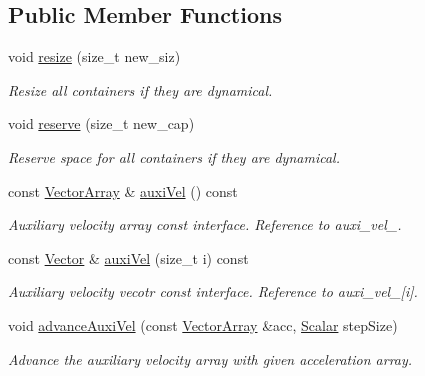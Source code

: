 \subsection*{Public Member Functions}
\begin{DoxyCompactItemize}
\item 
void \mbox{\hyperlink{class_space_h_1_1_vel_dep_particles_a38c984c371c95273fded00e1810473f9}{resize}} (size\+\_\+t new\+\_\+siz)
\begin{DoxyCompactList}\small\item\em Resize all containers if they are dynamical. \end{DoxyCompactList}\item 
void \mbox{\hyperlink{class_space_h_1_1_vel_dep_particles_a47b3d3219ae00febce8c2a3d779f5aee}{reserve}} (size\+\_\+t new\+\_\+cap)
\begin{DoxyCompactList}\small\item\em Reserve space for all containers if they are dynamical. \end{DoxyCompactList}\item 
const \mbox{\hyperlink{class_space_h_1_1_vel_indep_particles_aa9983058940249df8b00fa800e8cbad2}{Vector\+Array}} \& \mbox{\hyperlink{class_space_h_1_1_vel_dep_particles_a345c6bc4002525f79ae0cfb5232f35df}{auxi\+Vel}} () const
\begin{DoxyCompactList}\small\item\em Auxiliary velocity array const interface. Reference to auxi\+\_\+vel\+\_\+. \end{DoxyCompactList}\item 
const \mbox{\hyperlink{class_space_h_1_1_vel_indep_particles_a61bbcfdb0dc7f99f3c68af69a755c935}{Vector}} \& \mbox{\hyperlink{class_space_h_1_1_vel_dep_particles_a327db917c8b99eba9f81278f3ae1b0fc}{auxi\+Vel}} (size\+\_\+t i) const
\begin{DoxyCompactList}\small\item\em Auxiliary velocity vecotr const interface. Reference to auxi\+\_\+vel\+\_\+\mbox{[}i\mbox{]}. \end{DoxyCompactList}\item 
void \mbox{\hyperlink{class_space_h_1_1_vel_dep_particles_ad69e66caccfba5582be350169f8de895}{advance\+Auxi\+Vel}} (const \mbox{\hyperlink{class_space_h_1_1_vel_indep_particles_aa9983058940249df8b00fa800e8cbad2}{Vector\+Array}} \&acc, \mbox{\hyperlink{class_space_h_1_1_vel_indep_particles_aeb47d8131b30ed790320ff634f0d6af1}{Scalar}} step\+Size)
\begin{DoxyCompactList}\small\item\em Advance the auxiliary velocity array with given acceleration array. \end{DoxyCompactList}\item 

\end{DoxyCompactItemize}
